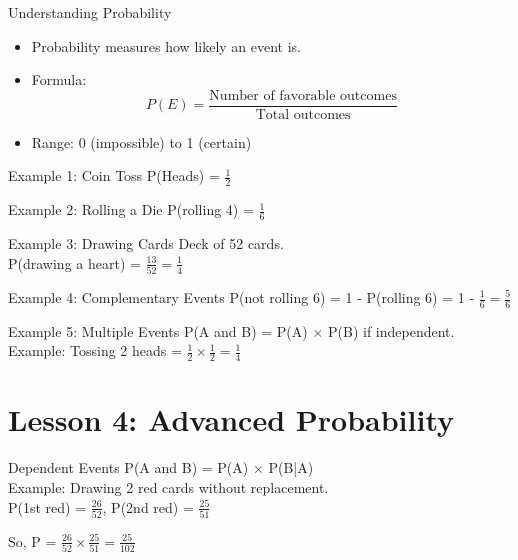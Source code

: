 \documentclass{beamer}
\begin{document}
\begin{frame}{Understanding Probability}
\begin{itemize}
  \item Probability measures how likely an event is.
  \item Formula:
  \[
  P(E) = \frac{\text{Number of favorable outcomes}}{\text{Total outcomes}}
  \]
  \item Range: 0 (impossible) to 1 (certain)
\end{itemize}
\end{frame}

\begin{frame}{Example 1: Coin Toss}
P(Heads) = \(\frac{1}{2}\)
\end{frame}

\begin{frame}{Example 2: Rolling a Die}
P(rolling 4) = \(\frac{1}{6}\)
\end{frame}

\begin{frame}{Example 3: Drawing Cards}
Deck of 52 cards.
\\
P(drawing a heart) = \(\frac{13}{52} = \frac{1}{4}\)
\end{frame}

\begin{frame}{Example 4: Complementary Events}
P(not rolling 6) = 1 - P(rolling 6) = 1 - \(\frac{1}{6} = \frac{5}{6}\)
\end{frame}

\begin{frame}{Example 5: Multiple Events}
P(A and B) = P(A) \(\times\) P(B) if independent.
\\
Example: Tossing 2 heads = \(\frac{1}{2}\times\frac{1}{2}=\frac{1}{4}\)
\end{frame}


\section{Lesson 4: Advanced Probability}

\begin{frame}{Dependent Events}
P(A and B) = P(A) \(\times\) P(B|A)\\
\vspace{0.2 cm}
Example: Drawing 2 red cards without replacement.
\\
\vspace{0.2 cm}
P(1st red) = \(\frac{26}{52}\), P(2nd red) = \(\frac{25}{51}\)\\
\vspace{0.2 cm}

So, P = \(\frac{26}{52}\times\frac{25}{51}=\frac{25}{102}\)
\end{frame}
\end{document}

